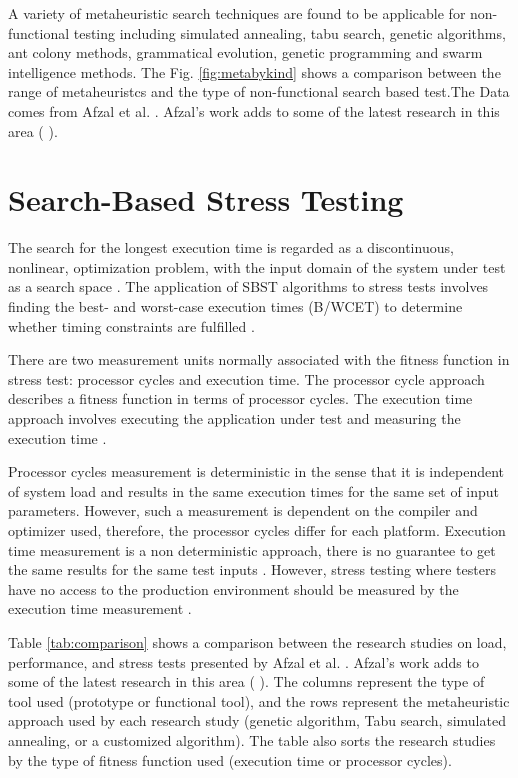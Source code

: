 A variety of metaheuristic search techniques are found to be applicable for non-functional testing including simulated annealing, tabu search, genetic algorithms, ant colony methods, grammatical evolution, genetic programming and swarm intelligence methods. The Fig. \ref{fig:metabykind} shows a comparison between the range of metaheuristcs and the type of non-functional search based test.The Data comes from Afzal et al. \cite{Afzal2009a}. Afzal's work adds to some of the latest research in this area (\cite{Garousi2006} \cite{Garousi2010} \cite{DiAlesio2013} \cite{DiAlesio2014} \cite{Alesio2015} \cite{Gois2016}). 





\section{Search-Based Stress Testing}

The search for the longest execution time is regarded as a discontinuous, nonlinear, optimization problem, with the input domain of the system under test as a search space \cite{Sullivan}.  The application of SBST algorithms to  stress tests involves finding the best- and worst-case execution times (B/WCET) to determine whether timing constraints are fulfilled \cite{Afzal2009a}. 

There are two measurement units normally associated with the fitness function in stress test: processor cycles and execution time. The processor cycle approach describes a fitness function in terms of processor cycles. The execution time approach involves executing the application under test and measuring the execution time \cite{Afzal2009a} \cite{tracey2000search}.

Processor cycles measurement is deterministic in the sense that it is independent of system load and results in the same execution times for the same set of input parameters. However, such a measurement is dependent on the compiler and optimizer used, therefore, the processor cycles differ for each platform. Execution time measurement is a non deterministic approach, there is no guarantee to get the same results for the same test inputs \cite{Afzal2009a}.  However, stress testing where testers have no access to the production environment should be measured by the execution time measurement \cite{Molyneaux2009} \cite{Afzal2009a}.

Table \ref{tab:comparison}  shows a comparison between the research studies on load, performance, and stress tests presented by Afzal et al. \cite{Afzal2009a}. Afzal's work adds to some of the latest research in this area (\cite{Garousi2006} \cite{Garousi2010} \cite{DiAlesio2013} \cite{DiAlesio2014} \cite{Alesio2015} \cite{Gois2016} ). The columns represent the type of tool used (prototype or functional tool), and the rows represent the metaheuristic approach used by each research study (genetic algorithm, Tabu search, simulated annealing, or a customized algorithm). The table also sorts the research studies by the type of fitness function used (execution time or processor cycles). 


